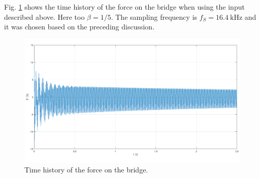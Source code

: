 \documentclass[a4paper]{article}
\begin{document}
Fig. \ref{fig:dleng} shows the time history of the force on the bridge when using the input described above. Here too $\beta = 1/5$. The sampling frequency is $f_S = \SI{16.4}{\kilo\hertz}$ and it was chosen based on the preceding discussion.


\begin{figure}[h]
	\centering
	\includegraphics[width=0.75\linewidth]{time.png}
	\caption{Time history of the force on the bridge.}
	\label{fig:dleng}
\end{figure}


\printbibliography
\end{document}
